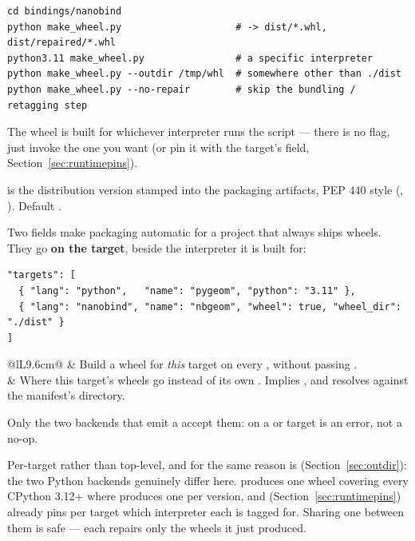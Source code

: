 \begin{lstlisting}[style=sh]
cd bindings/nanobind
python make_wheel.py                    # -> dist/*.whl, dist/repaired/*.whl
python3.11 make_wheel.py                # a specific interpreter
python make_wheel.py --outdir /tmp/whl  # somewhere other than ./dist
python make_wheel.py --no-repair        # skip the bundling / retagging step
\end{lstlisting}

The wheel is built for whichever interpreter runs the script --- there is no
 flag, just invoke the one you want (or pin it with the target's
 field, Section~\ref{sec:runtimepins}).

 is the distribution version stamped into the packaging
artifacts, PEP 440 style (, ). Default
.

Two fields make packaging automatic for a project that always ships wheels.
They go \textbf{on the target}, beside the interpreter it is built for:

\begin{lstlisting}[style=json]
"targets": [
  { "lang": "python",   "name": "pygeom", "python": "3.11" },
  { "lang": "nanobind", "name": "nbgeom", "wheel": true, "wheel_dir": "./dist" }
]
\end{lstlisting}

\begin{center}
\small
\begin{tabular}{@{}lL{9.6cm}@{}}
\toprule
{} & Build a wheel for \emph{this} target on every ,
  without passing . \\
\addlinespace
{} & Where this target's wheels go instead of its own
  . Implies , and resolves against the manifest's
  directory. \\
\bottomrule
\end{tabular}
\end{center}

Only the two backends that emit a  accept them:
 on a  or  target is an error, not a
no-op.

Per-target rather than top-level, and for the same reason  is
(Section~\ref{sec:outdir}): the two Python backends genuinely differ here.
 produces one  wheel covering every CPython 3.12+
where  produces one per version, and 
(Section~\ref{sec:runtimepins}) already pins per target which interpreter each
is tagged for. Sharing one  between them is safe --- each
 repairs only the wheels it just produced.

